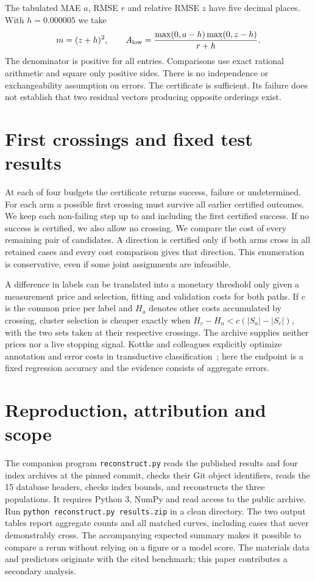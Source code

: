\documentclass[11pt]{article}
\begin{document}
\newpage
The tabulated MAE $a$, RMSE $r$ and relative RMSE $z$ have five decimal places. With $h=0.000005$ we take
\[
m=(z+h)^2,\qquad A_{\rm low}=
\frac{\max(0,a-h)\max(0,z-h)}{r+h}.
\]
The denominator is positive for all entries. Comparisons use exact rational arithmetic and square only positive sides. There is no independence or exchangeability assumption on errors. The certificate is sufficient. Its failure does not establish that two residual vectors producing opposite orderings exist.

\section{First crossings and fixed test results}
At each of four budgets the certificate returns success, failure or undetermined. For each arm a possible first crossing must survive all earlier certified outcomes. We keep each non-failing step up to and including the first certified success. If no success is certified, we also allow no crossing. We compare the cost of every remaining pair of candidates. A direction is certified only if both arms cross in all retained cases and every cost comparison gives that direction. This enumeration is conservative, even if some joint assignments are infeasible.



A difference in labels can be translated into a monetary threshold only given a measurement price and selection, fitting and validation costs for both paths. If $c$ is the common price per label and $H_a$ denotes other costs accumulated by crossing, cluster selection is cheaper exactly when $H_c-H_a<c(|S_a|-|S_c|)$, with the two sets taken at their respective crossings. The archive supplies neither prices nor a live stopping signal. Kottke and colleagues explicitly optimize annotation and error costs in transductive classification~\cite{kottke}; here the endpoint is a fixed regression accuracy and the evidence consists of aggregate errors.

\newpage



\section{Reproduction, attribution and scope}
The companion program \texttt{reconstruct.py} reads the published results and four index archives at the pinned commit, checks their Git object identifiers, reads the 15 database headers, checks index bounds, and reconstructs the three populations. It requires Python 3, NumPy and read access to the public archive. Run \texttt{python reconstruct.py results.zip} in a clean directory. The two output tables report aggregate counts and all matched curves, including cases that never demonstrably cross. The accompanying expected summary makes it possible to compare a rerun without relying on a figure or a model score. The materials data and predictors originate with the cited benchmark; this paper contributes a secondary analysis.
\end{document}
